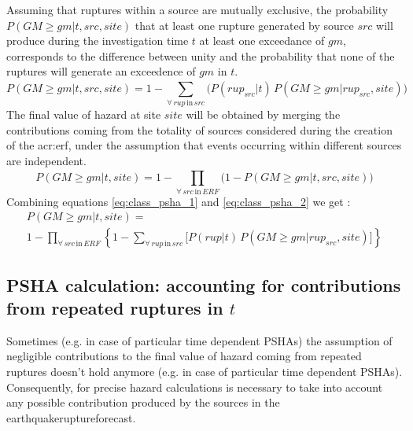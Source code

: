 Assuming that ruptures within a source are mutually exclusive, 
the probability $P(GM\geq gm|t,src,site)$ that at least one rupture 
generated by source $src$ will produce during the investigation 
time $t$ at least one exceedance of $gm$, corresponds to the 
difference between unity and the probability that none of the 
ruptures will generate an exceedence of $gm$ in $t$.
\begin{equation}
P(GM\geq gm|t,src,site) = 1 - \sum_{\forall\,rup\,\text{in}\,src}^{} 
	\Big( P(rup_{src}|t)\,
	P(GM\geq gm|rup_{src},site) \Big)
\label{eq:class_psha_1}
\end{equation}
The final value of hazard at site $site$ will be obtained by 
merging the contributions coming from the totality of sources 
considered during the creation of the \gls{acr:erf}, under the 
assumption that events occurring within different sources are 
independent.
%
\begin{equation}
P(GM \geq gm|t,site) = 1 - \prod_{\forall\,src\,\text{in}\,ERF}^{} 
\Big( 1-P(GM\geq gm|t,src,site) \Big) \label{eq:class_psha_2}
\end{equation}
%
Combining equations \ref{eq:class_psha_1} and \ref{eq:class_psha_2} 
we get \cite[see also][equation 4, page 410]{field2003}:
%
\begin{multline}
P(GM \geq gm|t,site) = \\
	1-\prod\limits_{\forall\,src\,\text{in}\,ERF}^{}  
	\left\{
		1-\sum\limits_{\forall\,rup\,\text{in}\,src}^{} 
			\biggl[ P(rup|t)\,P(GM\geq gm|rup_{src},site)
			\biggr]
	\right\}
\label{eq:PSHA_calculation}
\end{multline}
%
\subsection{PSHA calculation: accounting for contributions from 
repeated ruptures in $t$}
%
Sometimes  (e.g. in case of particular time dependent PSHAs) the 
assumption of negligible contributions to the final value 
of hazard coming from repeated ruptures doesn't hold anymore (e.g. in 
case of particular time dependent PSHAs). 
%
Consequently, for precise hazard calculations is necessary to take 
into account any possible contribution produced by the sources in the
\gls{earthquakeruptureforecast}.

